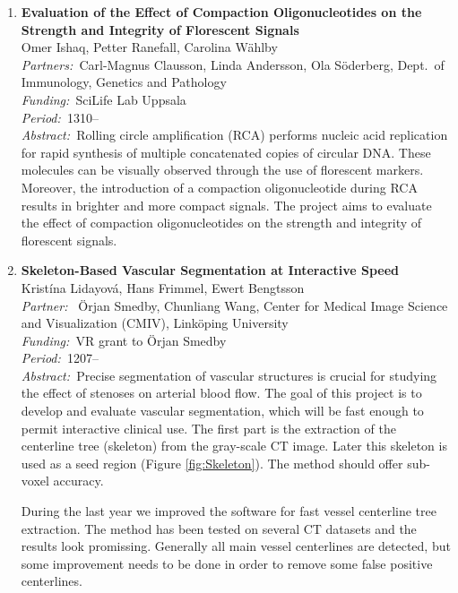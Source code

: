 \documentclass[10pt, a4paper]{article}
\newcommand{\aabstract}[1]{\emph{Abstract:~}#1}
\newcommand{\ffunding}[1]{\emph{Funding:~}#1\\}
\newcommand{\ppartner}[1]{\emph{Partner:~}#1\\}
\newcommand{\ppartners}[1]{\emph{Partners:~}#1\\}
\newcommand{\pperiod}[1]{\emph{Period:~}#1\\}
\begin{document}
\begin{enumerate}
\item 
\textbf{Evaluation of the Effect of Compaction Oligonucleotides on the Strength and Integrity of Florescent Signals }\\
Omer Ishaq, Petter Ranefall, Carolina W\"{a}hlby\\
\ppartners{Carl-Magnus Clausson, Linda Andersson, Ola S\"{o}derberg, Dept.~of Immunology, Genetics and Pathology}
\ffunding{SciLife Lab Uppsala}
\pperiod{1310--}
\aabstract{Rolling circle amplification (RCA) performs nucleic acid replication for rapid synthesis of multiple concatenated copies of circular DNA. These molecules can be visually observed through the use of florescent markers. Moreover, the introduction of a compaction oligonucleotide during RCA results in brighter and more compact signals. The project aims to evaluate the effect of compaction oligonucleotides on the strength and integrity of florescent signals.}





\item 
\textbf{Skeleton-Based Vascular Segmentation at Interactive Speed} \\
Krist\'{i}na Lidayov\'{a}, Hans Frimmel, Ewert Bengtsson \\
\ppartner{ \"{O}rjan Smedby, Chunliang Wang, Center for Medical Image Science and Visualization (CMIV), Link\"{o}ping University}
\ffunding{VR grant to \"{O}rjan Smedby}
\pperiod{1207--}
\aabstract{Precise segmentation of vascular structures is crucial for studying the effect of stenoses on arterial blood flow. The goal of this project is to develop and evaluate vascular segmentation, which will be fast enough to permit interactive clinical use. The first part is the extraction of the centerline tree (skeleton) from the gray-scale CT image. Later this skeleton is used as a seed region (Figure \ref{fig:Skeleton}). The method should offer sub-voxel accuracy.

During the last year we improved the software for fast vessel centerline tree extraction. The method has been tested on several CT datasets and the results look promissing. Generally all main vessel centerlines are detected, but some improvement  needs to be done in order to remove some false positive centerlines.}


\end{enumerate}
\end{document}
